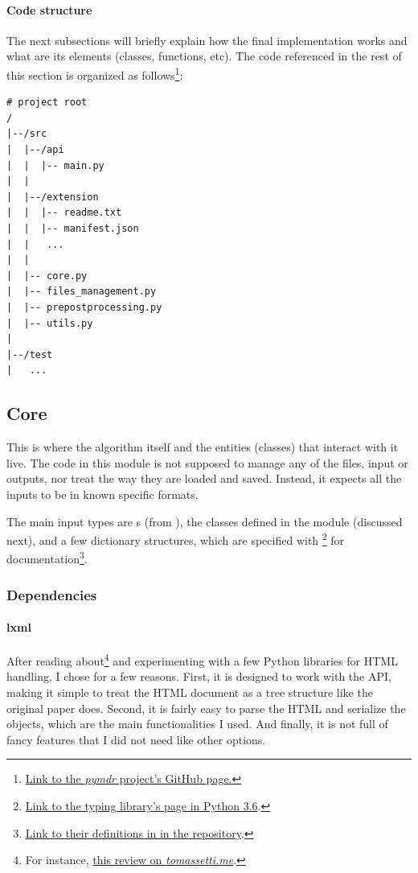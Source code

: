 \documentclass[10pt]{article}
\begin{document}

\paragraph{Code structure} The next subsections will briefly explain how the final implementation works and what are its elements (classes, functions, etc). The code referenced in the rest of this section is organized as follows\footnote{\href{https://github.com/joaopcbertoldo/pymdr}{Link to the \emph{pymdr} project's GitHub page.}}:

\begin{lstlisting}[caption=Main code structure]
# project root
/  
|--/src
|  |--/api
|  |  |-- main.py
|  |  
|  |--/extension
|  |  |-- readme.txt
|  |  |-- manifest.json
|  |   ...
|  |
|  |-- core.py
|  |-- files_management.py
|  |-- prepostprocessing.py 
|  |-- utils.py
|
|--/test 
|   ...
\end{lstlisting}



\subsection{Core}

This is where the algorithm itself and the entities (classes) that interact with it live. The code in this module is not supposed to manage any of the files, input or outputs, nor treat the way they are loaded and saved. Instead, it expects all the inputs to be in known specific formats.

The main input types are s (from ), the classes defined in the module (discussed next), and a few dictionary structures, which are specified with \footnote{\href{https://docs.python.org/3.6/library/typing.html}{Link to the typing library's page in Python 3.6}.} for documentation\footnote{\href{https://github.com/joaopcbertoldo/pymdr/blob/7ff7f7653feff23704b6b786db8499188ba378af/src/core.py\#L273}{Link to their definitions in  in the repository}.}.



\subsubsection{Dependencies}

\paragraph{lxml} After reading about\footnote{For instance,   \href{https://tomassetti.me/parsing-html/\#python}{this review on \emph{tomassetti.me}}.} and experimenting with a few Python libraries for HTML handling, I chose  for a few reasons. First, it is designed to work with the  API, making it simple to treat the HTML document as a tree structure like the original paper does. Second, it is fairly easy to parse the HTML and serialize the objects, which are the main functionalities I used. And finally, it is not full of fancy features that I did not need like other options.
\end{document}
